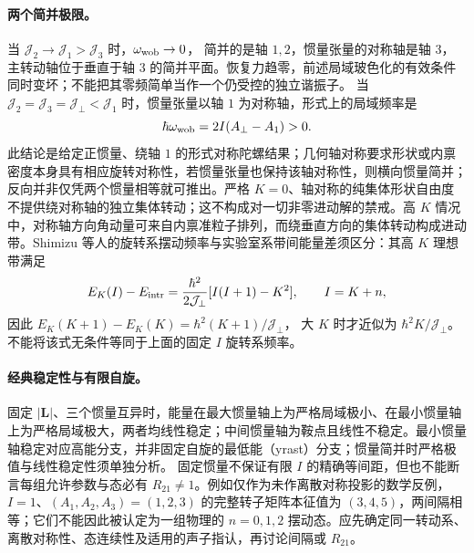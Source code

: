 \paragraph{两个简并极限。}
当 $\mathcal J_2\to\mathcal J_1>\mathcal J_3$ 时，$\omega_{\rm wob}\to0$，
简并的是轴 $1,2$，惯量张量的对称轴是轴 $3$，主转动轴位于垂直于轴 $3$ 的简并平面。恢复力趋零，前述局域玻色化的有效条件同时变坏；不能把其零频简单当作一个仍受控的独立谐振子。
当 $\mathcal J_2=\mathcal J_3=\mathcal J_\perp<\mathcal J_1$ 时，惯量张量以轴 $1$ 为对称轴，形式上的局域频率是
\begin{equation}
 \hbar\omega_{\rm wob}=2I(A_\perp-A_1)>0.
\end{equation}
此结论是给定正惯量、绕轴 $1$ 的形式对称陀螺结果；几何轴对称要求形状或内禀密度本身具有相应旋转对称性，若惯量张量也保持该轴对称性，则横向惯量简并；反向并非仅凭两个惯量相等就可推出。严格 $K=0$、轴对称的纯集体形状自由度不提供绕对称轴的独立集体转动；这不构成对一切非零进动解的禁戒。高 $K$ 情况中，对称轴方向角动量可来自内禀准粒子排列，而绕垂直方向的集体转动构成进动带。Shimizu 等人的旋转系摆动频率与实验室系带间能量差须区分：其高 $K$ 理想带满足
\begin{equation}
 E_K(I)-E_{\rm intr}=\frac{\hbar^2}{2\mathcal J_\perp}
 [I(I+1)-K^2],\qquad I=K+n,
\end{equation}
因此 $E_K(K+1)-E_K(K)=\hbar^2(K+1)/\mathcal J_\perp$，
大 $K$ 时才近似为 $\hbar^2K/\mathcal J_\perp$。不能将该式无条件等同于上面的固定 $I$ 旋转系频率。

\paragraph{经典稳定性与有限自旋。}
固定 $|\boldsymbol L|$、三个惯量互异时，能量在最大惯量轴上为严格局域极小、在最小惯量轴上为严格局域极大，两者均线性稳定；中间惯量轴为鞍点且线性不稳定。最小惯量轴稳定对应高能分支，并非固定自旋的最低能（yrast）分支；惯量简并时严格极值与线性稳定性须单独分析。
固定惯量不保证有限 $I$ 的精确等间距，但也不能断言每组允许参数与态必有 $R_{21}\ne1$。例如仅作为未作离散对称投影的数学反例，$I=1$、$(A_1,A_2,A_3)=(1,2,3)$ 的完整转子矩阵本征值为 $(3,4,5)$，两间隔相等；它们不能因此被认定为一组物理的 $n=0,1,2$ 摆动态。应先确定同一转动系、离散对称性、态连续性及适用的声子指认，再讨论间隔或 $R_{21}$。
